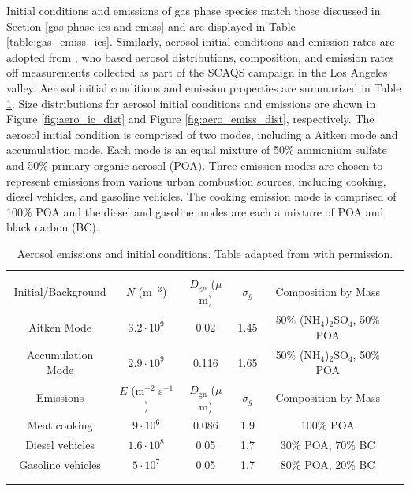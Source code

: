 Initial conditions and emissions of gas phase species match those discussed in Section \ref{gas-phase-ics-and-emiss} and are displayed in Table \ref{table:gas_emiss_ics}. Similarly, aerosol initial conditions and emission rates are adopted from \cite{riemer_simulating_2009}, who based aerosol distributions, composition, and emission rates off measurements collected as part of the SCAQS campaign in the Los Angeles valley. Aerosol initial conditions and emission properties are summarized in Table \ref{table:aero_emiss_ics}. Size distributions for aerosol initial conditions and emissions are shown in Figure \ref{fig:aero_ic_dist} and Figure \ref{fig:aero_emiss_dist}, respectively. The aerosol initial condition is comprised of two modes, including a Aitken mode and accumulation mode. Each mode is an equal mixture of 50\% ammonium sulfate and 50\% primary organic aerosol (POA). Three emission modes are chosen to represent emissions from various urban combustion sources, including cooking, diesel vehicles, and gasoline vehicles. The cooking emission mode is comprised of 100\% POA and the diesel and gasoline modes are each a mixture of POA and black carbon (BC). 

\begin{table}[h]
\centering
\caption{Aerosol emissions and initial conditions. Table adapted from \cite{riemer_simulating_2009} with permission.}
\begin{tabular*}{\linewidth}{@{\extracolsep{\fill}} cccccc}
\\[-2ex]\hline 
     \hline \\[-2ex] Initial/Background  & $N$ (m$^{-3}$) & $D_{\text{gn}}$ ($\mu$m) & $\sigma_g$ & Composition by Mass\\
 \midrule
Aitken Mode & $3.2 \cdot 10^9$ & 0.02 & 1.45 & 50\% (NH$_4$)$_2$SO$_4$, 50\% POA\\
Accumulation Mode & $2.9 \cdot 10^9$ & 0.116 & 1.65 & 50\% (NH$_4$)$_2$SO$_4$, 50\% POA\\
\midrule
Emissions & $E$ (m$^{-2}$ s$^{-1}$) & $D_{\text{gn}}$ ($\mu$m) & $\sigma_g$ & Composition by Mass\\
\midrule
Meat cooking & $9 \cdot 10^6$ & 0.086 & 1.9 & 100\% POA\\
Diesel vehicles & $1.6 \cdot 10^8$ & 0.05 & 1.7 & 30\% POA, 70\% BC \\
Gasoline vehicles & $5 \cdot 10^7$ & 0.05 & 1.7 & 80\% POA, 20\% BC \\
\\[-2ex]\hline 
     \hline \\[-2ex]
\end{tabular*}
\label{table:aero_emiss_ics}
\end{table}

